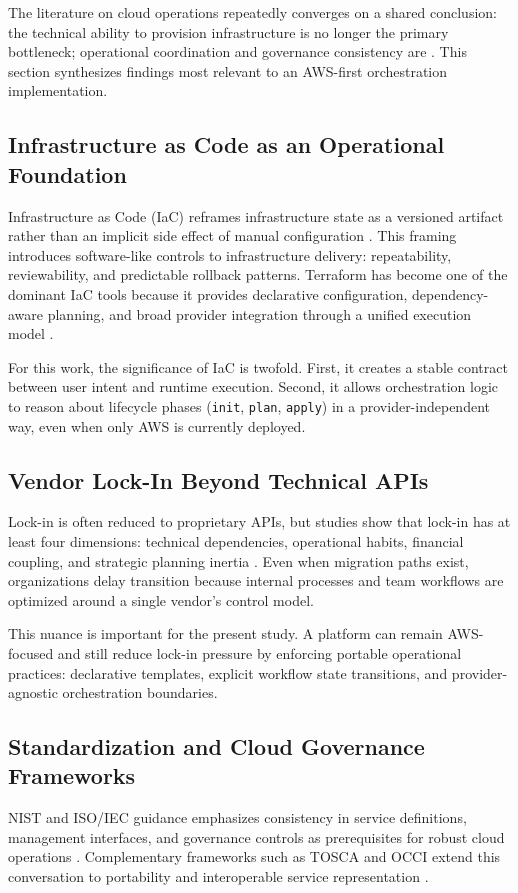 The literature on cloud operations repeatedly converges on a shared conclusion: the technical ability to provision infrastructure is no longer the primary bottleneck; operational coordination and governance consistency are \cite{karamitsos2023multicloud, gartner2024multicloud}. This section synthesizes findings most relevant to an AWS-first orchestration implementation.

\subsection{Infrastructure as Code as an Operational Foundation}
Infrastructure as Code (IaC) reframes infrastructure state as a versioned artifact rather than an implicit side effect of manual configuration \cite{morris2016iac}. This framing introduces software-like controls to infrastructure delivery: repeatability, reviewability, and predictable rollback patterns. Terraform has become one of the dominant IaC tools because it provides declarative configuration, dependency-aware planning, and broad provider integration through a unified execution model \cite{hashicorp2024terraform, terraform_docs}.

For this work, the significance of IaC is twofold. First, it creates a stable contract between user intent and runtime execution. Second, it allows orchestration logic to reason about lifecycle phases (\texttt{init}, \texttt{plan}, \texttt{apply}) in a provider-independent way, even when only AWS is currently deployed.

\subsection{Vendor Lock-In Beyond Technical APIs}
Lock-in is often reduced to proprietary APIs, but studies show that lock-in has at least four dimensions: technical dependencies, operational habits, financial coupling, and strategic planning inertia \cite{karamitsos2023multicloud, mckinsey2023costs}. Even when migration paths exist, organizations delay transition because internal processes and team workflows are optimized around a single vendor's control model.

This nuance is important for the present study. A platform can remain AWS-focused and still reduce lock-in pressure by enforcing portable operational practices: declarative templates, explicit workflow state transitions, and provider-agnostic orchestration boundaries.

\subsection{Standardization and Cloud Governance Frameworks}
NIST and ISO/IEC guidance emphasizes consistency in service definitions, management interfaces, and governance controls as prerequisites for robust cloud operations \cite{nist800145, nist500292, iso17788}. Complementary frameworks such as TOSCA and OCCI extend this conversation to portability and interoperable service representation \cite{oasisTOSCA, ogfOCCI}.

